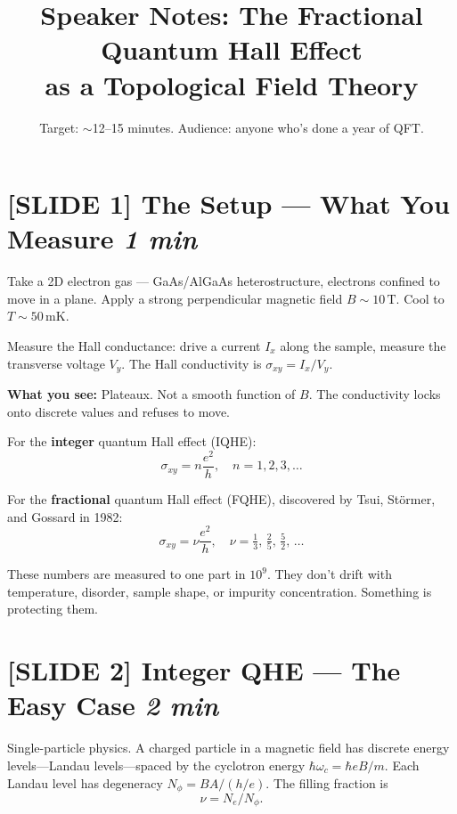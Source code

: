 \documentclass[11pt]{article}
\title{\textbf{Speaker Notes: The Fractional Quantum Hall Effect\\as a Topological Field Theory}}
\author{}
\date{Target: $\sim$12--15 minutes. Audience: anyone who's done a year of QFT.}
\begin{document}
\maketitle

\section{[SLIDE 1] The Setup --- What You Measure \hfill \normalfont\textit{1 min}}

Take a 2D electron gas --- GaAs/AlGaAs heterostructure, electrons confined to move in a plane. Apply a strong perpendicular magnetic field $B \sim 10\,\mathrm{T}$. Cool to $T \sim 50\,\mathrm{mK}$.

Measure the Hall conductance: drive a current $I_x$ along the sample, measure the transverse voltage $V_y$. The Hall conductivity is $\sigma_{xy} = I_x / V_y$.

\textbf{What you see:} Plateaux. Not a smooth function of $B$. The conductivity locks onto discrete values and refuses to move.

For the \textbf{integer} quantum Hall effect (IQHE):
\begin{equation}
\sigma_{xy} = n \frac{e^2}{h}, \quad n = 1, 2, 3, \ldots
\end{equation}

For the \textbf{fractional} quantum Hall effect (FQHE), discovered by Tsui, St\"ormer, and Gossard in 1982:
\begin{equation}
\sigma_{xy} = \nu \frac{e^2}{h}, \quad \nu = \tfrac{1}{3},\, \tfrac{2}{5},\, \tfrac{5}{2},\, \ldots
\end{equation}

These numbers are measured to one part in $10^9$. They don't drift with temperature, disorder, sample shape, or impurity concentration. Something is protecting them.

\section{[SLIDE 2] Integer QHE --- The Easy Case \hfill \normalfont\textit{2 min}}

Single-particle physics. A charged particle in a magnetic field has discrete energy levels---Landau levels---spaced by the cyclotron energy $\hbar\omega_c = \hbar eB/m$. Each Landau level has degeneracy $N_\phi = BA/(h/e)$. The filling fraction is
\begin{equation}
\nu = N_e / N_\phi.
\end{equation}
\end{document}
